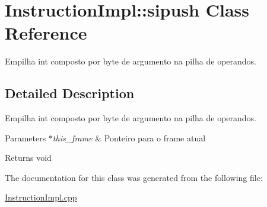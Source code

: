 \hypertarget{class_instruction_impl_1_1sipush}{}\section{Instruction\+Impl\+:\+:sipush Class Reference}
\label{class_instruction_impl_1_1sipush}


Empilha int composto por byte de argumento na pilha de operandos.  




\subsection{Detailed Description}
Empilha int composto por byte de argumento na pilha de operandos. 


\begin{DoxyParams}{Parameters}
{\em $\ast$this\+\_\+frame} & Ponteiro para o frame atual \\
\hline
\end{DoxyParams}
\begin{DoxyReturn}{Returns}
void 
\end{DoxyReturn}


The documentation for this class was generated from the following file\+:\begin{DoxyCompactItemize}
\item 
\hyperlink{_instruction_impl_8cpp}{Instruction\+Impl.\+cpp}\end{DoxyCompactItemize}
